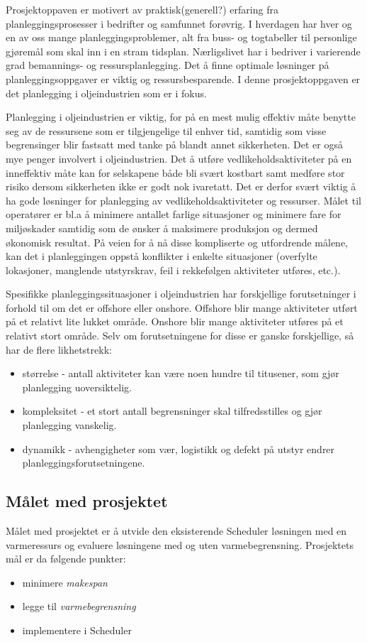 Prosjektoppaven er motivert av praktisk(generell?) erfaring fra planleggingsprosesser i bedrifter og samfunnet forøvrig. I hverdagen har hver og en av oss mange planleggingsproblemer, alt fra buss- og togtabeller til personlige gjøremål som skal inn i en stram tidsplan. Nærligslivet har i bedriver i varierende grad bemannings- og ressursplanlegging. Det å finne optimale løsninger på planleggingsoppgaver er viktig og ressursbesparende. I denne prosjektoppgaven er det planlegging i oljeindustrien som er i fokus.

Planlegging i oljeindustrien er viktig, for på en mest mulig effektiv måte benytte seg av de ressursene som er tilgjengelige til enhver tid, samtidig som visse begrensinger blir fastsatt med tanke på blandt annet sikkerheten. Det er også mye penger involvert i oljeindustrien. Det å utføre vedlikeholdsaktiviteter på en inneffektiv måte kan for selskapene både bli svært kostbart samt medføre stor risiko dersom sikkerheten ikke er godt nok ivaretatt. Det er derfor svært viktig å ha gode løsninger for planlegging av vedlikeholdsaktiviteter og ressurser. Målet til operatører er bl.a å minimere antallet farlige situasjoner og minimere fare for miljøskader samtidig som de ønsker å maksimere produksjon og dermed økonomisk resultat. På veien for å nå disse kompliserte og utfordrende målene, kan det i planleggingen oppstå konflikter i enkelte situasjoner (overfylte lokasjoner, manglende utstyrskrav, feil i rekkefølgen aktiviteter utføres, etc.).

Spesifikke planleggingssituasjoner i oljeindustrien har forskjellige forutsetninger i forhold til om det er offshore eller onshore. Offshore blir mange aktiviteter utført på et relativt lite lukket område. Onshore blir mange aktiviteter utføres på et relativt stort område. Selv om forutsetningene for disse er ganske forskjellige, så har de flere likhetstrekk:
\begin{itemize}
\item størrelse - antall aktiviteter kan være noen hundre til titusener, som gjør planlegging uoversiktelig.
\item kompleksitet - et stort antall begrensninger skal tilfredsstilles og gjør planlegging vanskelig.
\item dynamikk - avhengigheter som vær, logistikk og defekt på utstyr endrer planleggingsforutsetningene.
\end{itemize}

\subsection{Målet med prosjektet}
Målet med prosjektet er å utvide den eksisterende Scheduler løsningen med en varmeressurs og evaluere løsningene med og uten varmebegrensning. Prosjektets mål er da følgende punkter:
\begin{itemize}
\item minimere \textit{makespan}
\item legge til \textit{varmebegrensning}
\item implementere i Scheduler
\end{itemize}

